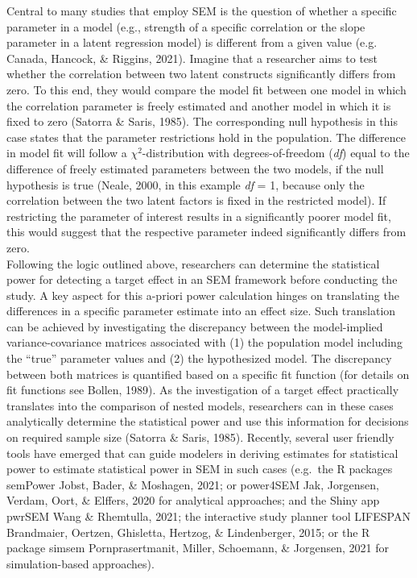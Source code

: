 \documentclass[
  man,floatsintext]{apa6}
\begin{document}
Central to many studies that employ SEM is the question of whether a specific parameter in a model (e.g., strength of a specific correlation or the slope parameter in a latent regression model) is different from a given value (e.g. Canada, Hancock, \& Riggins, 2021). Imagine that a researcher aims to test whether the correlation between two latent constructs significantly differs from zero. To this end, they would compare the model fit between one model in which the correlation parameter is freely estimated and another model in which it is fixed to zero (Satorra \& Saris, 1985). The corresponding null hypothesis in this case states that the parameter restrictions hold in the population. The difference in model fit will follow a \(\chi^2\)-distribution with degrees-of-freedom (\emph{df}) equal to the difference of freely estimated parameters between the two models, if the null hypothesis is true (Neale, 2000, in this example \emph{df} = 1, because only the correlation between the two latent factors is fixed in the restricted model). If restricting the parameter of interest results in a significantly poorer model fit, this would suggest that the respective parameter indeed significantly differs from zero.\\
Following the logic outlined above, researchers can determine the statistical power for detecting a target effect in an SEM framework before conducting the study. A key aspect for this a-priori power calculation hinges on translating the differences in a specific parameter estimate into an effect size. Such translation can be achieved by investigating the discrepancy between the model-implied variance-covariance matrices associated with (1) the population model including the ``true'' parameter values and (2) the hypothesized model. The discrepancy between both matrices is quantified based on a specific fit function (for details on fit functions see Bollen, 1989). As the investigation of a target effect practically translates into the comparison of nested models, researchers can in these cases analytically determine the statistical power and use this information for decisions on required sample size (Satorra \& Saris, 1985). Recently, several user friendly tools have emerged that can guide modelers in deriving estimates for statistical power to estimate statistical power in SEM in such cases (e.g.~the R packages semPower Jobst, Bader, \& Moshagen, 2021; or power4SEM Jak, Jorgensen, Verdam, Oort, \& Elffers, 2020 for analytical approaches; and the Shiny app pwrSEM Wang \& Rhemtulla, 2021; the interactive study planner tool LIFESPAN Brandmaier, Oertzen, Ghisletta, Hertzog, \& Lindenberger, 2015; or the R package simsem Pornprasertmanit, Miller, Schoemann, \& Jorgensen, 2021 for simulation-based approaches).
\end{document}
